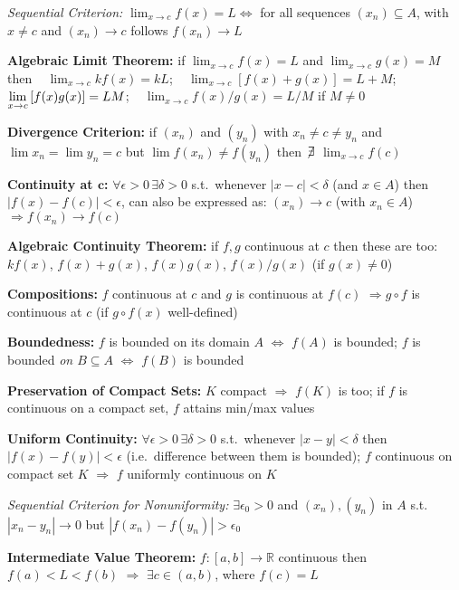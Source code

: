 \documentclass[8pt,twoside]{extarticle}
\begin{document}
\begin{multicols}{2}
 \textit{Sequential Criterion:}  $\lim_{x\to c} f(x)=L \Leftrightarrow$ for all sequences $(x_n)\subseteq A$, with $x\neq c$ and $(x_n)\to c$ follows $f(x_n)\to L$

 \textbf{Algebraic Limit Theorem:} if $\displaystyle\lim_{x\to c}f(x)=L$ and $\displaystyle\lim_{x\to c}g(x)=M$ then \,\,\,
$\displaystyle\lim_{x\to c}kf(x)=kL$;  \,\,\,
$\displaystyle\lim_{x\to c}\left[f(x) + g(x)\right]=L+M$; $\displaystyle\lim_{x\to c}\left[f(x)g(x)\displaystyle\right]=LM$; \,\,\, $\displaystyle\lim_{x\to c}f(x)/g(x)=L/M$ if $M\neq 0$

 \textbf{Divergence Criterion:} if $(x_n)$ and $(y_n)$ with $x_n\neq c \neq y_n$ and $\lim x_n{=}\lim y_n{=}c$ but $\lim f(x_n) {\neq} f(y_n)$ then $\not\!\exists$ $\lim_{x\to c}f(c)$ 

 \textbf{Continuity at $\boldsymbol{c}$:} $\forall \epsilon>0\,\exists \delta>0$ s.t.\ whenever
 $|x-c|<\delta$ (and $x\in A$) then $|f(x)-f(c)|<\epsilon$, 
 can also be expressed as: \newline $(x_n)\to c$ (with $x_n \in A$) $\Rightarrow f(x_n)\to f(c)$
 
  \textbf{Algebraic Continuity Theorem:} if $f,g$ continuous at $c$ then these are too: $kf(x)$, $f(x){+}g(x)$, $f(x)g(x)$, $f(x)/g(x)$ (if $g(x){\neq} 0$)
 
  \textbf{Compositions:} $f$  continuous at $c$ and $g$ is continuous at $f(c)$ $\Rightarrow g\circ f$ is continuous at $c$ (if $g \circ f(x)$ well-defined)
 
  \textbf{Boundedness:} $f$ is bounded on its domain $A$ $\Leftrightarrow$ $f(A)$ is bounded; $f$ is bounded \textit{on $B\subseteq A$} $\Leftrightarrow$ $f(B)$ is bounded

 \textbf{Preservation of Compact Sets:} $K$ compact $\Rightarrow$ $f(K)$ is too;
if $f$ is continuous on a compact set, $f$ attains min/max values

 \textbf{Uniform Continuity:} $\forall \epsilon>0\,\exists \delta>0$ s.t.\ whenever
 $|x-y|<\delta$ then $|f(x)-f(y)|<\epsilon$ (i.e.\ difference between them is bounded);
 $f$ continuous on compact set $K$ $\Rightarrow$ $f$ uniformly continuous on $K$
 
  \textit{Sequential Criterion for Nonuniformity:} $\exists \epsilon_0>0$ and $(x_n),(y_n)$ in $A$ s.t.\ $|x_n-y_n|\to 0$ but $|f(x_n) - f(y_n)|>\epsilon_0$


 \textbf{Intermediate Value Theorem:} $f:[a,b]\to\mathbb{R}$ continuous then $f(a)<L<f(b)$ $\Rightarrow$ $\exists c\in (a,b)$, where $f(c)=L$


\end{multicols}
\end{document}
